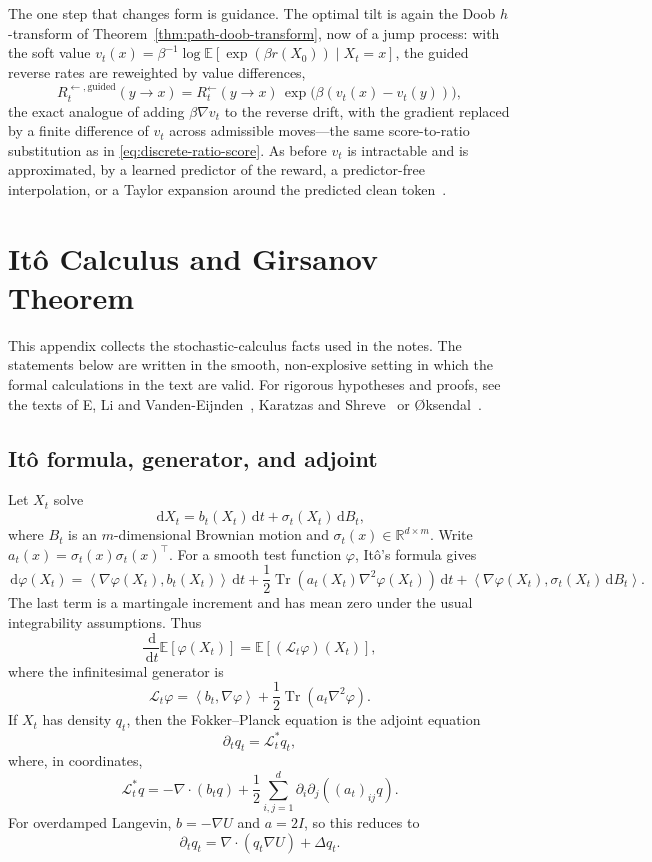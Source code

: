 \documentclass{amsart}
\numberwithin{equation}{section}
\theoremstyle{plain}
\theoremstyle{definition}
\theoremstyle{remark}
\DeclareMathOperator{\Tr}{Tr}
\newcommand{\R}{\mathbb{R}}
\newcommand{\E}{\mathbb{E}}
\newcommand{\dd}{\,\mathrm{d}}
\newcommand{\Id}{I}
\newcommand{\ip}[2]{\left\langle #1,#2 \right\rangle}
\begin{document}
The one step that changes form is guidance.  The optimal tilt is again the Doob
$h$-transform of Theorem~\ref{thm:path-doob-transform}, now of a jump process:
with the soft value $v_t(x)=\beta^{-1}\log\E[\exp(\beta r(X_0))\mid X_t=x]$, the
guided reverse rates are reweighted by value differences,
\[
    R_t^{\leftarrow,\mathrm{guided}}(y\to x)
    =R_t^{\leftarrow}(y\to x)\,\exp\!\big(\beta(v_t(x)-v_t(y))\big),
\]
the exact analogue of adding $\beta\nabla v_t$ to the reverse drift, with the gradient
replaced by a finite difference of $v_t$ across admissible moves---the same
score-to-ratio substitution as in \eqref{eq:discrete-ratio-score}.  As before
$v_t$ is intractable and is approximated, by a learned predictor of the reward,
a predictor-free interpolation, or a Taylor expansion around the predicted clean
token~\cite{nisonoff2024discreteguidance}.

\appendix

\section{It\^o Calculus and Girsanov Theorem}\label{app:ito-girsanov}

This appendix collects the stochastic-calculus facts used in the notes.  The
statements below are written in the smooth, non-explosive setting in which the
formal calculations in the text are valid.  For rigorous hypotheses and
proofs, see the texts of E, Li and Vanden-Eijnden~\cite{e2019appliedstochastic}, Karatzas and Shreve~\cite{karatzas1991brownian}
or {\O}ksendal~\cite{oksendal2003stochastic}.

\subsection*{It\^o formula, generator, and adjoint}

Let $X_t$ solve
\[
    \dd X_t=b_t(X_t)\dd t+\sigma_t(X_t)\dd B_t,
\]
where $B_t$ is an $m$-dimensional Brownian motion and
$\sigma_t(x)\in\R^{d\times m}$.  Write
$a_t(x)=\sigma_t(x)\sigma_t(x)^\top$.  For a smooth test function $\varphi$,
It\^o's formula gives
\[
    \dd\varphi(X_t)
    =
    \ip{\nabla\varphi(X_t)}{b_t(X_t)}\dd t
    +\frac12\Tr\!\left(a_t(X_t)\nabla^2\varphi(X_t)\right)\dd t
    +\ip{\nabla\varphi(X_t)}{\sigma_t(X_t)\dd B_t}.
\]
The last term is a martingale increment and has mean zero under the usual
integrability assumptions.  Thus
\[
    \frac{\dd}{\dd t}\E[\varphi(X_t)]
    =
    \E[(\mathcal L_t\varphi)(X_t)],
\]
where the infinitesimal generator is
\[
    \mathcal L_t\varphi
    =
    \ip{b_t}{\nabla\varphi}
    +\frac12\Tr(a_t\nabla^2\varphi).
\]
If $X_t$ has density $q_t$, then the Fokker--Planck equation is the adjoint
equation
\[
    \partial_tq_t=\mathcal L_t^\ast q_t,
\]
where, in coordinates,
\[
    \mathcal L_t^\ast q
    =
    -\nabla\cdot(b_tq)
    +\frac12\sum_{i,j=1}^d
    \partial_i\partial_j\!\left((a_t)_{ij}q\right).
\]
For overdamped Langevin, $b=-\nabla U$ and $a=2\Id$, so this reduces to
\[
    \partial_tq_t=\nabla\cdot(q_t\nabla U)+\Delta q_t.
\]
\end{document}

